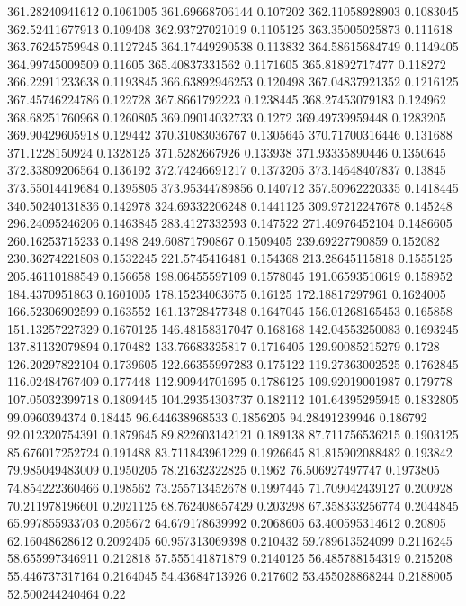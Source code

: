 361.28240941612 0.1061005
361.69668706144 0.107202
362.11058928903 0.1083045
362.52411677913 0.109408
362.93727021019 0.1105125
363.35005025873 0.111618
363.76245759948 0.1127245
364.17449290538 0.113832
364.58615684749 0.1149405
364.99745009509 0.11605
365.40837331562 0.1171605
365.81892717477 0.118272
366.22911233638 0.1193845
366.63892946253 0.120498
367.04837921352 0.1216125
367.45746224786 0.122728
367.8661792223 0.1238445
368.27453079183 0.124962
368.68251760968 0.1260805
369.09014032733 0.1272
369.49739959448 0.1283205
369.90429605918 0.129442
370.31083036767 0.1305645
370.71700316446 0.131688
371.1228150924 0.1328125
371.5282667926 0.133938
371.93335890446 0.1350645
372.33809206564 0.136192
372.74246691217 0.1373205
373.14648407837 0.13845
373.55014419684 0.1395805
373.95344789856 0.140712
357.50962220335 0.1418445
340.50240131836 0.142978
324.69332206248 0.1441125
309.97212247678 0.145248
296.24095246206 0.1463845
283.4127332593 0.147522
271.40976452104 0.1486605
260.16253715233 0.1498
249.60871790867 0.1509405
239.69227790859 0.152082
230.36274221808 0.1532245
221.5745416481 0.154368
213.28645115818 0.1555125
205.46110188549 0.156658
198.06455597109 0.1578045
191.06593510619 0.158952
184.4370951863 0.1601005
178.15234063675 0.16125
172.18817297961 0.1624005
166.52306902599 0.163552
161.13728477348 0.1647045
156.01268165453 0.165858
151.13257227329 0.1670125
146.48158317047 0.168168
142.04553250083 0.1693245
137.81132079894 0.170482
133.76683325817 0.1716405
129.90085215279 0.1728
126.20297822104 0.1739605
122.66355997283 0.175122
119.27363002525 0.1762845
116.02484767409 0.177448
112.90944701695 0.1786125
109.92019001987 0.179778
107.05032399718 0.1809445
104.29354303737 0.182112
101.64395295945 0.1832805
99.0960394374 0.18445
96.644638968533 0.1856205
94.28491239946 0.186792
92.012320754391 0.1879645
89.822603142121 0.189138
87.711756536215 0.1903125
85.676017252724 0.191488
83.711843961229 0.1926645
81.815902088482 0.193842
79.985049483009 0.1950205
78.21632322825 0.1962
76.506927497747 0.1973805
74.854222360466 0.198562
73.255713452678 0.1997445
71.709042439127 0.200928
70.211978196601 0.2021125
68.762408657429 0.203298
67.358333256774 0.2044845
65.997855933703 0.205672
64.679178639992 0.2068605
63.400595314612 0.20805
62.16048628612 0.2092405
60.957313069398 0.210432
59.789613524099 0.2116245
58.655997346911 0.212818
57.555141871879 0.2140125
56.485788154319 0.215208
55.446737317164 0.2164045
54.43684713926 0.217602
53.455028868244 0.2188005
52.500244240464 0.22
